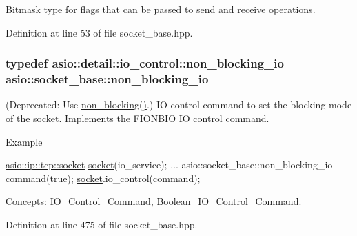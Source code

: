 Bitmask type for flags that can be passed to send and receive operations. 



Definition at line 53 of file socket\+\_\+base.\+hpp.

\hypertarget{classasio_1_1socket__base_ab4de0f3662c5f485d867da65d30e7e8b}{}
\subsubsection[{non\+\_\+blocking\+\_\+io}]{\setlength{\rightskip}{0pt plus 5cm}typedef {\bf asio\+::detail\+::io\+\_\+control\+::non\+\_\+blocking\+\_\+io} {\bf asio\+::socket\+\_\+base\+::non\+\_\+blocking\+\_\+io}}\label{classasio_1_1socket__base_ab4de0f3662c5f485d867da65d30e7e8b}
(Deprecated\+: Use \hyperlink{namespaceasio_1_1detail_1_1descriptor__ops_abc164de9d9f17c5082e27e043bd4bb3da9694dc69c579805472d9c180aa66cd15}{non\+\_\+blocking()}.) I\+O control command to set the blocking mode of the socket. Implements the F\+I\+O\+N\+B\+I\+O I\+O control command.

\begin{DoxyParagraph}{Example}

\begin{DoxyCode}
\hyperlink{classasio_1_1basic__stream__socket}{asio::ip::tcp::socket} \hyperlink{namespacewebsocketpp_1_1transport_1_1asio_1_1socket_1_1error_a828ddaa5ed63a761e1b557465a35f05aa0c31b356014843e1d09514e794a539a7}{socket}(io\_service); 
...
asio::socket\_base::non\_blocking\_io command(\textcolor{keyword}{true});
\hyperlink{namespacewebsocketpp_1_1transport_1_1asio_1_1socket_1_1error_a828ddaa5ed63a761e1b557465a35f05aa0c31b356014843e1d09514e794a539a7}{socket}.io\_control(command);
\end{DoxyCode}

\end{DoxyParagraph}
\begin{DoxyParagraph}{Concepts\+:}
I\+O\+\_\+\+Control\+\_\+\+Command, Boolean\+\_\+\+I\+O\+\_\+\+Control\+\_\+\+Command. 
\end{DoxyParagraph}


Definition at line 475 of file socket\+\_\+base.\+hpp.

\hypertarget{classasio_1_1socket__base_a7d102a034ff7e2a71dfe6434c6ba0525}{}
